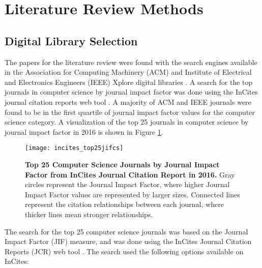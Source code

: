 



\appendices

\section{Literature Review Methods}  \label{appendix:literature-review-methods}

\subsection{Digital Library Selection} \label{appendix:digital-library-selection}

The papers for the literature review were found with the search engines available in the Association for Computing Machinery (ACM) \cite{ACM:2017} and Institute of Electrical and Electronics Engineers (IEEE) Xplore digital libraries \cite{IEEE:2017}. A search for the top journals in computer science by journal impact factor \cite{Garfield:2006b} was done using the InCites journal citation reports web tool \cite{Clarivate:2017a}. A majority of ACM and IEEE journals were found to be in the first quartile of journal impact factor values for the computer science category. A visualization of the top 25 journals in computer science by journal impact factor in 2016 is shown in Figure \ref{figure:incites_top25jifcs}.

\begin{figure}[!t]
	\centering
	\texttt{[image: incites\_top25jifcs]}
	\caption{\textbf{Top 25 Computer Science Journals by Journal Impact Factor from InCites Journal Citation Report in 2016.} Gray circles represent the Journal Impact Factor, where higher Journal Impact Factor values are represented by larger sizes. Connected lines represent the citation relationships between each journal, where thicker lines mean stronger relationships.}
	\label{figure:incites_top25jifcs}
\end{figure}

The search for the top 25 computer science journals was based on the Journal Impact Factor (JIF) \cite{Garfield:2006b} measure, and was done using the InCites Journal Citation Reports (JCR) web tool \cite{Clarivate:2017a}. The search used the following options available on InCites:

